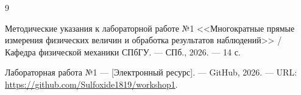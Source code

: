 \begin{thebibliography}{9}

 
{Методические указания к лабораторной работе №1 <<Многократные прямые измерения физических величин и обработка результатов наблюдений>>} / Кафедра физической механики СПбГУ. ---
\newblock СПб., 2026. --- 14 с.

{Лабораторная работа №1} --- [Электронный ресурс]. --- 
\newblock GitHub, 2026. --- 
\newblock URL: \url{https://github.com/Sulfoxide1819/workshop1}.

\end{thebibliography}